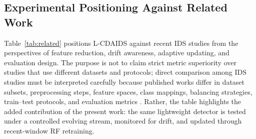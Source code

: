 \documentclass[11pt,a4paper]{article}
\begin{document}
\begin{table}[!ht]
\centering
\caption{Corpus-scale robustness check: the published 50-tree
class-weight-balanced configuration against the 100-tree unweighted
configuration of Table~\ref{tab:rf-feature}, same sample pool, phases, and
three seeds. $R_{\text{novel}}$ is Phase-3 recall on attack rows from
families withheld from training (attack-family holdout, Table~\ref{tab:family});
the covariate-shift columns are Phase-3 values from Table~\ref{tab:fullaffine}.}
\label{tab:configrobust}
\small
{}
\end{table}

\subsection{Experimental Positioning Against Related Work}

Table~\ref{tab:related} positions L-CDAIDS against recent IDS studies
from the perspectives of feature reduction, drift awareness, adaptive
updating, and evaluation design. The purpose is not to claim strict
metric superiority over studies that use different datasets and
protocols; direct comparison among IDS studies must be interpreted
carefully because published works differ in dataset subsets,
preprocessing steps, feature spaces, class mappings, balancing
strategies, train--test protocols, and evaluation metrics
\cite{apruzzese2022}. Rather, the table highlights the added
contribution of the present work: the same lightweight detector is
tested under a controlled evolving stream, monitored for drift, and
updated through recent-window RF retraining.
\end{document}
